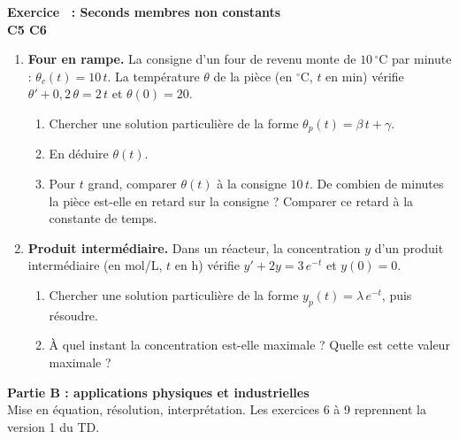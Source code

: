 \documentclass[a4paper,11pt]{article}
\newcounter{exo}
\newcommand{\partie}[2]{\needspace{\dimexpr0.5\textheight+2.5cm\relax}\vspace{6pt}%
\begin{tcolorbox}[colback=uimmblue, colframe=uimmblue, sharp corners, boxrule=0pt, left=10pt, top=5pt, bottom=5pt]
{\color{white}\large\bfseries #1}\\[1pt]{\color{white}\small #2}
\end{tcolorbox}}
\newcommand{\exo}[4]{\needspace{0.5\textheight}\refstepcounter{exo}\label{exo:\theexo}\vspace{8pt}%
\begin{tcolorbox}[colback=uimmlightblue, colframe=uimmblue, boxrule=0.8pt, arc=2pt, left=6pt, right=6pt, top=3pt, bottom=3pt]
{\color{uimmblue}\bfseries Exercice \theexo\ : #1}\\
{\small\color{uimmred}\bfseries #2\quad #3}%
\if\relax\detokenize{#4}\relax\else\\{\footnotesize\color{uimmgray}\itshape #4}\fi
\end{tcolorbox}}
\newcommand{\rep}[1]{\par\noindent\begin{minipage}[t][#1cm]{\linewidth}\mbox{}\end{minipage}\par}
\begin{document}
\exo{Seconds membres non constants}{C5 C6}{[S01] [C01] [C02]}{}
\begin{enumerate}
  \item \textbf{Four en rampe.} La consigne d'un four de revenu monte de $10\,^\circ$C par minute : $\theta_c(t) = 10\,t$. La température $\theta$ de la pièce (en $^\circ$C, $t$ en min) vérifie $\theta' + 0{,}2\,\theta = 2\,t$ et $\theta(0) = 20$.
  \begin{enumerate}
    \needspace{4.6cm}
    \item Chercher une solution particulière de la forme $\theta_p(t) = \beta\,t + \gamma$.
    \rep{3}
    \needspace{4.1cm}
    \item En déduire $\theta(t)$.
    \rep{2.5}
    \needspace{4.6cm}
    \item Pour $t$ grand, comparer $\theta(t)$ à la consigne $10\,t$. De combien de minutes la pièce est-elle en retard sur la consigne ? Comparer ce retard à la constante de temps.
    \rep{2.5}
  \end{enumerate}
  \item \textbf{Produit intermédiaire.} Dans un réacteur, la concentration $y$ d'un produit intermédiaire (en mol/L, $t$ en h) vérifie $y' + 2y = 3\,e^{-t}$ et $y(0) = 0$.
  \begin{enumerate}
    \needspace{5.6cm}
    \item Chercher une solution particulière de la forme $y_p(t) = \lambda\,e^{-t}$, puis résoudre.
    \rep{3.5}
    \needspace{5.6cm}
    \item À quel instant la concentration est-elle maximale ? Quelle est cette valeur maximale ?
    \rep{3.5}
  \end{enumerate}
\end{enumerate}

\partie{Partie B : applications physiques et industrielles}{Mise en équation, résolution, interprétation. Les exercices 6 à 9 reprennent la version 1 du TD.}
\end{document}
